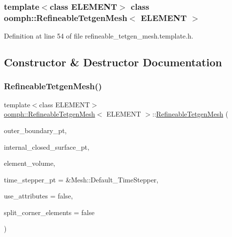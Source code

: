 \subsubsection*{template$<$class E\+L\+E\+M\+E\+NT$>$\newline
class oomph\+::\+Refineable\+Tetgen\+Mesh$<$ E\+L\+E\+M\+E\+N\+T $>$}



Definition at line 54 of file refineable\+\_\+tetgen\+\_\+mesh.\+template.\+h.



\subsection{Constructor \& Destructor Documentation}
\mbox{\label{classoomph_1_1RefineableTetgenMesh_a9ac439f3e1825013c81098e0fa35733b}} 
\subsubsection{\texorpdfstring{Refineable\+Tetgen\+Mesh()}{RefineableTetgenMesh()}\hspace{0.1cm}{\footnotesize\ttfamily [1/2]}}
{\footnotesize\ttfamily template$<$class E\+L\+E\+M\+E\+NT$>$ \\
\hyperlink{classoomph_1_1RefineableTetgenMesh}{oomph\+::\+Refineable\+Tetgen\+Mesh}$<$ E\+L\+E\+M\+E\+NT $>$\+::\hyperlink{classoomph_1_1RefineableTetgenMesh}{Refineable\+Tetgen\+Mesh} (\begin{DoxyParamCaption}\item[{Tet\+Mesh\+Faceted\+Closed\+Surface $\ast$const \&}]{outer\+\_\+boundary\+\_\+pt,  }\item[{Vector$<$ Tet\+Mesh\+Faceted\+Surface $\ast$$>$ \&}]{internal\+\_\+closed\+\_\+surface\+\_\+pt,  }\item[{const double \&}]{element\+\_\+volume,  }\item[{Time\+Stepper $\ast$}]{time\+\_\+stepper\+\_\+pt = {\ttfamily \&Mesh\+:\+:Default\+\_\+TimeStepper},  }\item[{const bool \&}]{use\+\_\+attributes = {\ttfamily false},  }\item[{const bool \&}]{split\+\_\+corner\+\_\+elements = {\ttfamily false} }\end{DoxyParamCaption})\hspace{0.3cm}{\ttfamily [inline]}}




